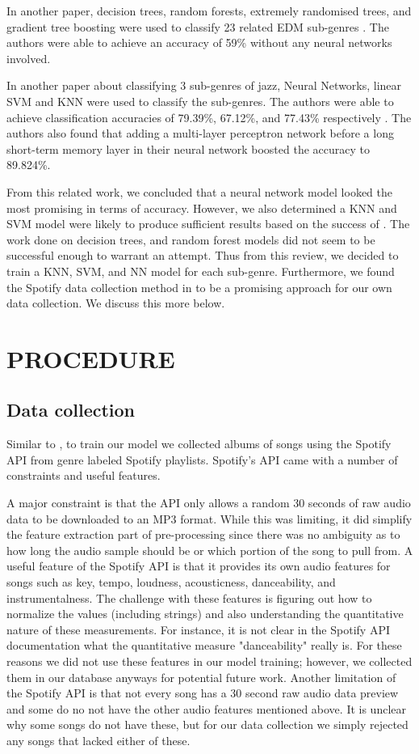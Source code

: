 \documentclass[letterpaper, 12 pt, conference]{ieeeconf}  %
\begin{document}
In another paper, decision trees, random forests, extremely randomised trees, and gradient tree boosting were used to classify 23 related EDM sub-genres \cite{c6}. The authors were able to achieve an accuracy of 59\% without any neural networks involved. 

In another paper about classifying 3 sub-genres of jazz, Neural Networks, linear SVM and KNN were used to classify the sub-genres. The authors were able to achieve classification accuracies of 79.39\%, 67.12\%, and 77.43\%  respectively \cite{c7}. The authors also found that adding a multi-layer perceptron network before a long short-term memory layer in their neural network boosted the accuracy to 89.824\%.

From this related work, we concluded that a neural network model looked the most promising in terms of accuracy. However, we also determined a KNN and SVM model were likely to produce sufficient results based on the success of \cite{c7}. The work done on decision trees, and random forest models did not seem to be successful enough to warrant an attempt. Thus from this review, we decided to train a KNN, SVM, and NN model for each sub-genre. Furthermore, we found the Spotify data collection method in \cite{c5} to be a promising approach for our own data collection. We discuss this more below.




\section{PROCEDURE}


\subsection{Data collection}


Similar to \cite{c5}, to train our model we collected albums of songs using the Spotify API from genre labeled Spotify playlists. Spotify’s API came with a number of constraints and useful features.

A major constraint is that the API only allows a random 30 seconds of raw audio data to be downloaded to an MP3 format. While this was limiting, it did simplify the feature extraction part of pre-processing since there was no ambiguity as to how long the audio sample should be or which portion of the song to pull from. A useful feature of the Spotify API is that it provides its own audio features for songs such as key, tempo, loudness, acousticness, danceability, and instrumentalness. The challenge with these features is figuring out how to normalize the values (including strings) and also understanding the quantitative nature of these measurements. For instance, it is not clear in the Spotify API documentation what the quantitative measure "danceability" really is. For these reasons we did not use these features in our model training; however, we collected them in our database anyways for potential future work. Another limitation of the Spotify API is that not every song has a 30 second raw audio data preview and some do no not have the other audio features mentioned above. It is unclear why some songs do not have these, but for our data collection we simply rejected any songs that lacked either of these.
\end{document}
